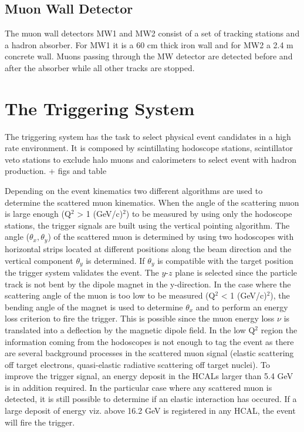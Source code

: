 \subsection*{Muon Wall Detector}

The muon wall detectors MW1 and MW2 consist of a set of tracking stations and a hadron absorber. For MW1 it is a 60 cm thick iron wall and for MW2 a 2.4 m concrete wall.
Muons passing through the MW detector are detected before and after the absorber while all other tracks are stopped.


\section{The Triggering System}

The triggering system \cite{} has the task to select physical event candidates in a high rate environment. It is composed by scintillating hodoscope stations,
scintillator veto stations to exclude halo muons and calorimeters to select event with hadron production. + figs and table

Depending on the event kinematics two different algorithms are used to determine the scattered muon kinematics. When the angle of the scattering muon is large enough
(Q$^2$ > 1 (GeV/c)$^2$) to be measured by using only the hodoscope stations, the trigger signals are built using the vertical pointing algorithm. The angle
($\theta_x,\theta_y$) of the scattered muon is determined by using two hodoscopes with horizontal strips located at different positions along the beam direction
and the vertical component $\theta_y$ is determined. If $\theta_y$ is compatible with the target position the trigger system validates the event. The $y$-$z$ plane
is selected since the particle track is not bent by the dipole magnet in the y-direction. In the case where the scattering angle of the muon is too low to be measured
(Q$^2$ < 1 (GeV/c)$^2$), the bending angle of the magnet is used to determine $\theta_x$ and to perform an energy loss criterion to fire the trigger. This is possible
since the muon energy loss $\nu$ is translated into a deflection by the magnetic dipole field. In the low Q$^2$ region the information coming from the hodoscopes is
not enough to tag the event as there are several background processes in the scattered muon signal (elastic scattering off target electrons, quasi-elastic radiative
scattering off target nuclei). To improve the trigger signal, an energy deposit in the HCALs larger than 5.4 GeV is in addition required. In the particular case
where any scattered muon is detected, it is still possible to determine if an elastic interaction has occured. If a large deposit of energy viz. above 16.2 GeV is registered
in any HCAL, the event will fire the trigger.

